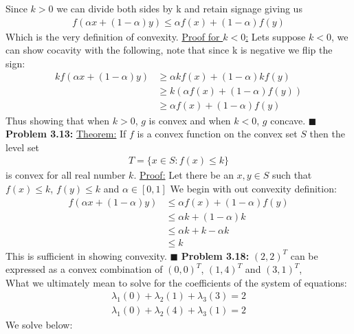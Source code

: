 \documentclass{article}
\begin{document}
Since $k > 0$ we can divide both sides by k and retain signage giving us
\begin{align*} 
    f(\alpha x + (1 - \alpha)y) \leq \alpha f(x) + (1 - \alpha)f(y)
\end{align*}
Which is the very definition of convexity. \newline
\underline{Proof for $k < 0$:} Lets suppose $k < 0$, we can show cocavity with the following, note that since k is negative we flip the sign:
\begin{align*}
    kf(\alpha x + (1 - \alpha)y) & \geq \alpha kf(x) + (1 - \alpha)kf(y) \\
    & \geq k(\alpha f(x) + (1 - \alpha)f(y)) \\
    & \geq \alpha f(x) + (1 - \alpha)f(y)
\end{align*}
Thus showing that when $k > 0$, $g$ is convex and when $k < 0$, $g$ concave. $\blacksquare$
\break
\break
\textbf{Problem 3.13:} \underline{Theorem:} If $f$ is a convex function on the convex set $S$ then the level set
\begin{align*}
    T = \{ x \in S : f(x) \leq k \}
\end{align*}
is convex for all real number $k$. \newline
\underline{Proof:} Let there be an $x,y \in S$ such that $f(x) \leq k$, $f(y) \leq k$ and $\alpha \in [0,1]$ We begin with out convexity definition:
\begin{align*}
    f(\alpha x + (1 - \alpha)y) & \leq \alpha f(x) + (1 - \alpha)f(y) \\
    & \leq \alpha k + (1 - \alpha)k \\
    & \leq \alpha k + k - \alpha k \\
    & \leq k
\end{align*}
This is sufficient in showing convexity. $\blacksquare$
\newline
\break
\textbf{Problem 3.18:} $(2,2)^T$ can be expressed as a convex combination of $(0, 0)^T$, $(1,4)^T$ and $(3,1)^T$, \\
What we ultimately mean to solve for the coefficients of the system of equations:
\begin{align*}
    \lambda_1(0) + \lambda_2(1) + \lambda_3(3) = 2 \\
    \lambda_1(0) + \lambda_2(4) + \lambda_3(1) = 2
\end{align*}
We solve below:
\end{document}
